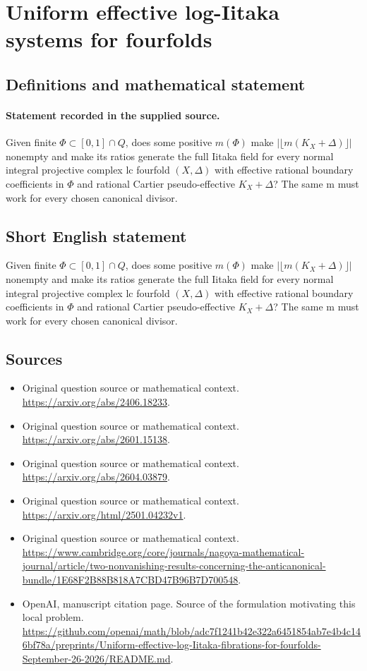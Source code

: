 \documentclass[11pt]{article}
\begin{document}
\section*{Uniform effective log-Iitaka systems for fourfolds}\label{statement}
\subsection{Definitions and mathematical statement}
\paragraph{Statement recorded in the supplied source.}
Given finite $\Phi \subset [0,1]\cap Q$, does some positive $m(\Phi )$ make $|\lfloor m(K_X+\Delta )\rfloor |$ nonempty and make its ratios generate the full Iitaka field for every normal integral projective complex lc fourfold $(X,\Delta )$ with effective rational boundary coefficients in $\Phi $ and rational Cartier pseudo-effective $K_X+\Delta $? The same m must work for every chosen canonical divisor.
\subsection{Short English statement}
Given finite $\Phi \subset [0,1]\cap Q$, does some positive $m(\Phi )$ make $|\lfloor m(K_X+\Delta )\rfloor |$ nonempty and make its ratios generate the full Iitaka field for every normal integral projective complex lc fourfold $(X,\Delta )$ with effective rational boundary coefficients in $\Phi $ and rational Cartier pseudo-effective $K_X+\Delta $? The same m must work for every chosen canonical divisor.
\subsection{Sources}
\begin{itemize}
\item[S1] Original question source or mathematical context.
\url{https://arxiv.org/abs/2406.18233}.
\item[S2] Original question source or mathematical context.
\url{https://arxiv.org/abs/2601.15138}.
\item[S3] Original question source or mathematical context.
\url{https://arxiv.org/abs/2604.03879}.
\item[S4] Original question source or mathematical context.
\url{https://arxiv.org/html/2501.04232v1}.
\item[S5] Original question source or mathematical context.
\url{https://www.cambridge.org/core/journals/nagoya-mathematical-journal/article/two-nonvanishing-results-concerning-the-anticanonical-bundle/1E68F2B88B818A7CBD47B96B7D700548}.
\item[S6] OpenAI, manuscript citation page. Source of the formulation motivating this local problem.
\url{https://github.com/openai/math/blob/adc7f1241b42e322a6451854ab7e4b4c146bf78a/preprints/Uniform-effective-log-Iitaka-fibrations-for-fourfolds-September-26-2026/README.md}.
\end{itemize}
\end{document}
